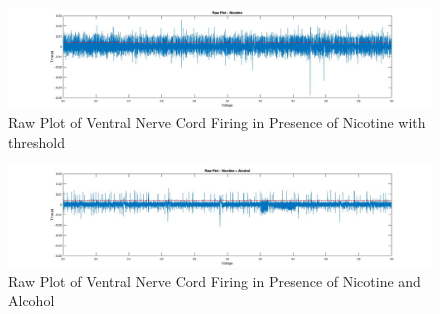 \documentclass{article}
\begin{document}
\begin{figure}
  \includegraphics[width=\linewidth]{nicotine.jpg}
  \caption{Raw Plot of Ventral Nerve Cord Firing in Presence of Nicotine with threshold}
  \label{fig: Raw Plot of Ventral Nerve Cord Firing in Presence of Nicotine}
\end{figure}

\begin{figure}
  \includegraphics[width=\linewidth]{nical.jpg}
  \caption{Raw Plot of Ventral Nerve Cord Firing in Presence of Nicotine and Alcohol}
  \label{fig:  Raw Plot of Ventral Nerve Cord Firing in Presence of Nicotine and Alcohol}
\end{figure}
\end{document}
